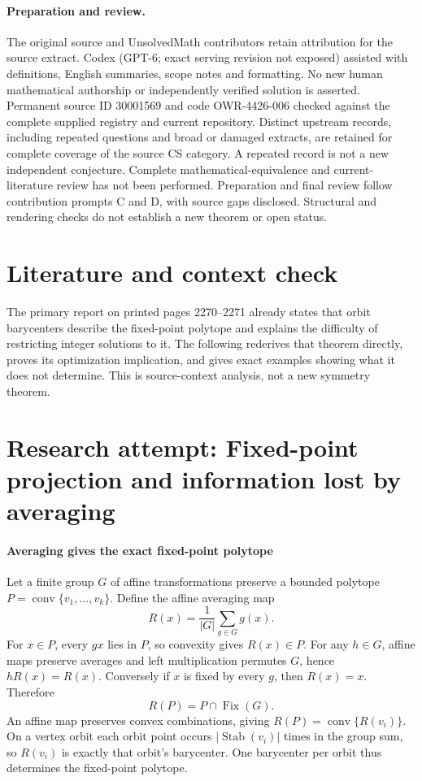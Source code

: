 \documentclass[11pt]{article}
\begin{document}
\paragraph{Preparation and review.}
The original source and UnsolvedMath contributors retain attribution for the source extract. Codex (GPT-6; exact serving revision not exposed) assisted with definitions, English summaries, scope notes and formatting. No new human mathematical authorship or independently verified solution is asserted. Permanent source ID 30001569 and code OWR-4426-006 checked against the complete supplied registry and current repository. Distinct upstream records, including repeated questions and broad or damaged extracts, are retained for complete coverage of the source CS category. A repeated record is not a new independent conjecture. Complete mathematical-equivalence and current-literature review has not been performed. Preparation and final review follow contribution prompts C and D, with source gaps disclosed. Structural and rendering checks do not establish a new theorem or open status.
\label{end:30001569}

\section{Literature and context check}
The primary report on printed pages 2270--2271 already states that orbit barycenters describe the fixed-point polytope and explains the difficulty of restricting integer solutions to it. The following rederives that theorem directly, proves its optimization implication, and gives exact examples showing what it does not determine. This is source-context analysis, not a new symmetry theorem.
\section{Research attempt: Fixed-point projection and information lost by averaging}

\paragraph{Averaging gives the exact fixed-point polytope}
Let a finite group $G$ of affine transformations preserve a bounded polytope $P=\operatorname{conv}\{v_1,\ldots,v_k\}$. Define the affine averaging map
\[
 R(x)=\frac1{|G|}\sum_{g\in G}g(x).
\]
For $x\in P$, every $gx$ lies in $P$, so convexity gives $R(x)\in P$. For any $h\in G$, affine maps preserve averages and left multiplication permutes $G$, hence $hR(x)=R(x)$. Conversely if $x$ is fixed by every $g$, then $R(x)=x$. Therefore
\[
 R(P)=P\cap\operatorname{Fix}(G).
\]
An affine map preserves convex combinations, giving $R(P)=\operatorname{conv}\{R(v_i)\}$. On a vertex orbit each orbit point occurs $|\operatorname{Stab}(v_i)|$ times in the group sum, so $R(v_i)$ is exactly that orbit's barycenter. One barycenter per orbit thus determines the fixed-point polytope.
\end{document}
